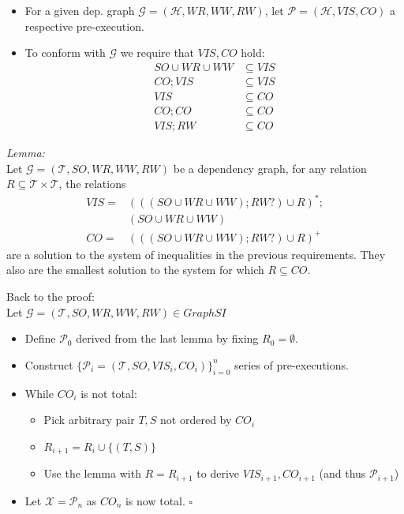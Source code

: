 \documentclass{beamer}
\begin{document}
\begin{frame}
	\begin{itemize}
		\item For a given dep. graph $\mathcal{G} = (\mathcal{H}, WR, WW, RW)$, let $\mathcal{P} = (\mathcal{H}, VIS, CO)$ a respective pre-execution.
		\item To conform with $\mathcal{G}$ we require that $VIS,CO$ hold: \\
			\begin{align}
				SO \cup WR \cup WW & \subseteq VIS \\
				CO; VIS & \subseteq VIS \\
				VIS & \subseteq CO \\
				CO; CO & \subseteq CO \\
				VIS; RW & \subseteq CO
			\end{align}
	\end{itemize}
\end{frame}

\begin{frame}
	\textit{Lemma:} \\
	Let $\mathcal{G} = (\mathcal{T}, SO, WR, WW, RW)$ be a dependency graph, for any relation $R \subseteq \mathcal{T} \times \mathcal{T}$, the relations
	$$
		\begin{aligned}
			VIS = {} & (((SO \cup WR \cup WW); RW?) \cup R)^*; \\
			         & (SO \cup WR \cup WW) \\
			 CO = {} & (((SO \cup WR \cup WW); RW?) \cup R)^+
		\end{aligned}
	$$
	are a solution to the system of inequalities in the previous requirements. They also are the smallest solution to the system for which $R \subseteq CO$.
\end{frame}

\begin{frame}
	Back to the proof: \\
	Let $\mathcal{G} = (\mathcal{T}, SO, WR, WW, RW) \in GraphSI$
	\begin{itemize}
		\item Define $\mathcal{P}_0$ derived from the last lemma by fixing $R_0 = \emptyset$.
		\item Construct $\{\mathcal{P}_i = (\mathcal{T}, SO, VIS_i, CO_i)\}^n_{i=0}$ series of pre-executions.
		\item While $CO_i$ is not total:
		\begin{itemize}
			\item Pick arbitrary pair $T,S$ not ordered by $CO_i$
			\item $R_{i+1} = R_i \cup \{(T,S)\}$
			\item Use the lemma with $R = R_{i+1}$ to derive $VIS_{i+1}, CO_{i+1}$ (and thus $\mathcal{P}_{i+1}$)
		\end{itemize}
		\item Let $\mathcal{X} = \mathcal{P}_n$ as $CO_n$ is now total. $\square$
	\end{itemize}
\end{frame}
\end{document}

